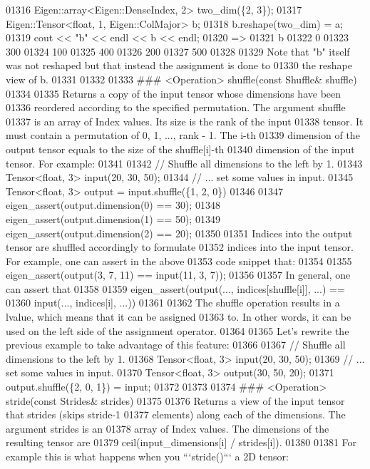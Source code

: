 \begin{DoxyCode}
01316     Eigen::array<Eigen::DenseIndex, 2> two\_dim(\{2, 3\});
01317     Eigen::Tensor<float, 1, Eigen::ColMajor> b;
01318     b.reshape(two\_dim) = a;
01319     cout << "b" << endl << b << endl;
01320     =>
01321     b
01322       0
01323     300
01324     100
01325     400
01326     200
01327     500
01328 
01329 Note that "b" itself was not reshaped but that instead the assignment is done to
01330 the reshape view of b.
01331 
01332 
01333 ### <Operation> shuffle(const Shuffle& shuffle)
01334 
01335 Returns a copy of the input tensor whose dimensions have been
01336 reordered according to the specified permutation. The argument shuffle
01337 is an array of Index values. Its size is the rank of the input
01338 tensor. It must contain a permutation of 0, 1, ..., rank - 1. The i-th
01339 dimension of the output tensor equals to the size of the shuffle[i]-th
01340 dimension of the input tensor. For example:
01341 
01342     // Shuffle all dimensions to the left by 1.
01343     Tensor<float, 3> input(20, 30, 50);
01344     // ... set some values in input.
01345     Tensor<float, 3> output = input.shuffle(\{1, 2, 0\})
01346 
01347     eigen\_assert(output.dimension(0) == 30);
01348     eigen\_assert(output.dimension(1) == 50);
01349     eigen\_assert(output.dimension(2) == 20);
01350 
01351 Indices into the output tensor are shuffled accordingly to formulate
01352 indices into the input tensor. For example, one can assert in the above
01353 code snippet that:
01354 
01355     eigen\_assert(output(3, 7, 11) == input(11, 3, 7));
01356 
01357 In general, one can assert that
01358 
01359     eigen\_assert(output(..., indices[shuffle[i]], ...) ==
01360                  input(..., indices[i], ...))
01361 
01362 The shuffle operation results in a lvalue, which means that it can be assigned
01363 to. In other words, it can be used on the left side of the assignment operator.
01364 
01365 Let's rewrite the previous example to take advantage of this feature:
01366 
01367     // Shuffle all dimensions to the left by 1.
01368     Tensor<float, 3> input(20, 30, 50);
01369     // ... set some values in input.
01370     Tensor<float, 3> output(30, 50, 20);
01371     output.shuffle(\{2, 0, 1\}) = input;
01372 
01373 
01374 ### <Operation> stride(const Strides& strides)
01375 
01376 Returns a view of the input tensor that strides (skips stride-1
01377 elements) along each of the dimensions.  The argument strides is an
01378 array of Index values.  The dimensions of the resulting tensor are
01379 ceil(input\_dimensions[i] / strides[i]).
01380 
01381 For example this is what happens when you ```stride()``` a 2D tensor:

\end{DoxyCode}
